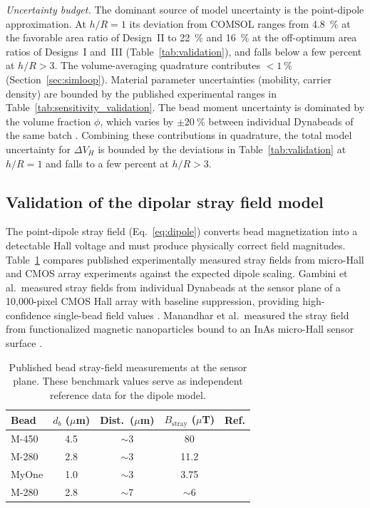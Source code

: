 \documentclass[preprint,review,12pt]{elsarticle}
\begin{document}
\textit{Uncertainty budget.} The dominant source of model uncertainty is the point-dipole approximation. At $h/R = 1$ its deviation from COMSOL ranges from \SI{4.8}{\percent} at the favorable area ratio of Design~II to \SI{22}{\percent} and \SI{16}{\percent} at the off-optimum area ratios of Designs~I and~III (Table~\ref{tab:validation}), and falls below a few percent at $h/R > 3$. The volume-averaging quadrature contributes ${<}\SI{1}{\percent}$ (Section~\ref{sec:simloop}). Material parameter uncertainties (mobility, carrier density) are bounded by the published experimental ranges in Table~\ref{tab:sensitivity_validation}. The bead moment uncertainty is dominated by the volume fraction $\phi$, which varies by ${\pm}\SI{20}{\percent}$ between individual Dynabeads of the same batch \cite{fonnum2005}. Combining these contributions in quadrature, the total model uncertainty for $\Delta V_H$ is bounded by the deviations in Table~\ref{tab:validation} at $h/R = 1$ and falls to a few percent at $h/R > 3$.

\subsection{Validation of the dipolar stray field model}
\label{sec:strayvalidation}

The point-dipole stray field (Eq.~\eqref{eq:dipole}) converts bead magnetization into a detectable Hall voltage and must produce physically correct field magnitudes. Table~\ref{tab:stray} compares published experimentally measured stray fields from micro-Hall and CMOS array experiments against the expected dipole scaling. Gambini et al.\ measured stray fields from individual Dynabeads at the sensor plane of a 10{,}000-pixel CMOS Hall array with baseline suppression, providing high-confidence single-bead field values \cite{gambini2013}. Manandhar et al.\ measured the stray field from functionalized magnetic nanoparticles bound to an InAs micro-Hall sensor surface \cite{manandhar2009}.

\begin{table}[!htbp]
\caption{Published bead stray-field measurements at the sensor plane. These benchmark values serve as independent reference data for the dipole model.}
\label{tab:stray}
\centering
\footnotesize
\begin{tabular}{@{}lcccc@{}}
\toprule
Bead & $d_b$ ($\mu$m) & Dist.\ ($\mu$m) & $B_{\text{stray}}$ ($\mu$T) & Ref. \\
\midrule
M-450 & 4.5 & ${\sim}$3 & 80 & \cite{gambini2013} \\
M-280 & 2.8 & ${\sim}$3 & 11.2 & \cite{gambini2013} \\
MyOne & 1.0 & ${\sim}$3 & 3.75 & \cite{gambini2013} \\
M-280 & 2.8 & ${\sim}$7 & ${\sim}$6 & \cite{besse2002} \\
\bottomrule
\end{tabular}
\end{table}
\end{document}
